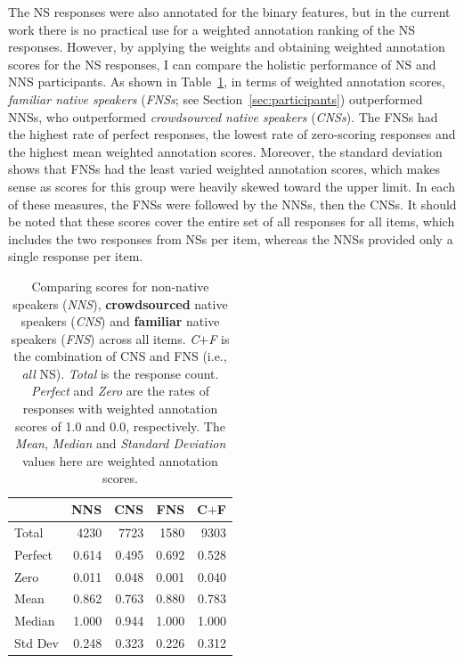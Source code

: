 The NS responses were also annotated for the binary features, but in the current work there is no practical use for a weighted annotation ranking of the NS responses. However, by applying the weights and obtaining weighted annotation scores for the NS responses, I can compare the holistic performance of NS and NNS participants. As shown in Table~\ref{tab:was1}, in terms of weighted annotation scores, \textit{familiar native speakers} (\textit{FNSs}; see Section~\ref{sec:participants}) outperformed NNSs, who outperformed \textit{crowdsourced native speakers} (\textit{CNSs}). The FNSs had the highest rate of perfect responses, the lowest rate of zero-scoring responses and the highest mean weighted annotation scores. Moreover, the standard deviation shows that FNSs had the least varied weighted annotation scores, which makes sense as scores for this group were heavily skewed toward the upper limit. In each of these measures, the FNSs were followed by the NNSs, then the CNSs. It should be noted that these scores cover the entire set of all responses for all items, which includes the two responses from NSs per item, whereas the NNSs provided only a single response per item.


\begin{table}[htb!]
\begin{center}
\begin{tabular}{|l||r||r|r||r|}
\hline
 & NNS	& CNS & FNS & C$+$F \\
\hline
\hline
Total & 4230 & 7723 & 1580 & 9303 \\
\hline
\hline
Perfect & 0.614 & 0.495 & 0.692 & 0.528 \\
\hline
Zero & 0.011 & 0.048 & 0.001 & 0.040 \\
\hline
\hline
Mean & 0.862 & 0.763 & 0.880 & 0.783 \\
\hline
Median & 1.000 & 0.944 & 1.000 & 1.000 \\
\hline
Std Dev & 0.248 & 0.323 & 0.226 & 0.312 \\
\hline
\end{tabular}
\caption{\label{tab:was1} Comparing scores for non-native speakers (\textit{NNS}), \textbf{crowdsourced} native speakers (\textit{CNS}) and \textbf{familiar} native speakers (\textit{FNS}) across all items. \textit{C$+$F} is the combination of CNS and FNS (i.e., \textit{all} NS). \textit{Total} is the response count. \textit{Perfect} and \textit{Zero} are the rates of responses with weighted annotation scores of 1.0 and 0.0, respectively. The \textit{Mean}, \textit{Median} and \textit{Standard Deviation} values here are weighted annotation scores.}
\end{center}
\end{table}

